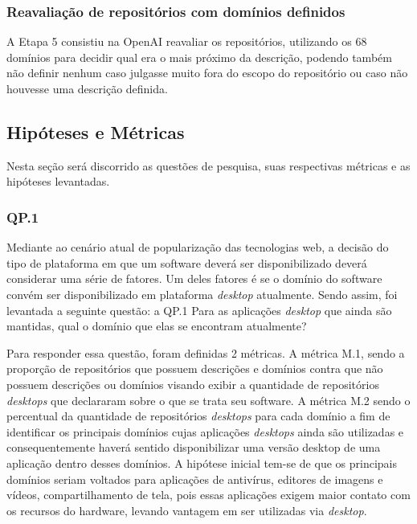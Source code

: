 \documentclass[12pt]{article}
\begin{document}
\subsubsection{Reavaliação de repositórios com domínios definidos}

A Etapa 5 consistiu na OpenAI reavaliar os repositórios, utilizando os 68 domínios para decidir qual era o mais próximo da descrição, podendo também não definir nenhum caso julgasse muito fora do escopo do repositório ou caso não houvesse uma descrição definida.

\subsection{Hipóteses e Métricas}

Nesta seção será discorrido as questões de pesquisa, suas respectivas métricas e as hipóteses levantadas.

\subsubsection{QP.1}

Mediante ao cenário atual de popularização das tecnologias web, a decisão do tipo de plataforma em que um software deverá ser disponibilizado  deverá considerar uma série de fatores. Um deles fatores é se o domínio do software convém ser disponibilizado em plataforma \textit{desktop} atualmente. Sendo assim, foi levantada a seguinte questão: a QP.1 Para as aplicações \textit{desktop} que ainda são mantidas, qual o domínio que elas se encontram atualmente?

Para responder essa questão, foram definidas 2 métricas. A métrica M.1, sendo a proporção de repositórios que possuem descrições e domínios contra que não possuem descrições ou domínios visando exibir a quantidade de repositórios \textit{desktops} que declararam sobre o que se trata seu software. A métrica M.2 sendo o percentual da quantidade de repositórios \textit{desktops} para cada domínio a fim de identificar os principais domínios cujas aplicações \textit{desktops} ainda são utilizadas e consequentemente haverá sentido disponibilizar uma versão desktop de uma aplicação dentro desses domínios. A hipótese inicial tem-se de que os principais domínios seriam voltados para aplicações de antivírus, editores de imagens e vídeos, compartilhamento de tela, pois essas aplicações exigem maior contato com os recursos do hardware, levando vantagem em ser utilizadas via \textit{desktop}.
\end{document}
